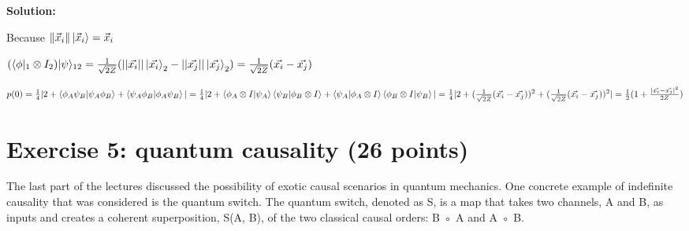 \documentclass[12pt]{article}
\begin{document}
\begin{enumerate}[start=4]
        \textbf{Solution:}

        Because $\|\vec{x}_i\|\ket{\vec{x}_i} = \vec{x}_i$


        $(\langle\phi|_1 \otimes I_2)|\psi\rangle_{12}
        \\=\frac{1}{\sqrt{2Z}}(||\vec{x_i}||\ket{\vec{x_i}}_2-||\vec{x_j}||\ket{\vec{x_j}}_2)
        \\=\frac{1}{\sqrt{2Z}}(\vec{x_i}-\vec{x_j})
        $

        $p(0)
        \\=\frac{1}{4}|2+\braket{\phi_A\psi_B|\psi_A\phi_B}+\braket{\psi_A\phi_B|\phi_A\psi_B}|
        \\=\frac{1}{4}|2+\braket{\phi_A\otimes I|\psi_A}\braket{\psi_B|\phi_B\otimes I}+\braket{\psi_A|\phi_A\otimes I}\braket{\phi_B\otimes I|\psi_B}|
        \\=\frac{1}{4}|2+(\frac{1}{\sqrt{2Z}}(\vec{x_i}-\vec{x_j}))^2+(\frac{1}{\sqrt{2Z}}(\vec{x_i}-\vec{x_j}))^2|
        \\=\frac{1}{2}(1+\frac{|\vec{x_i}-\vec{x_j}|^2}{2Z})
        $

    \end{enumerate}

\section{Exercise 5: quantum causality (26 points)}
The last part of the lectures discussed the possibility of exotic causal scenarios in quantum mechanics. One concrete example of indefinite causality that was considered is the quantum switch. The quantum switch, denoted as S, is a map that takes two channels, A and B, as inputs and creates a coherent superposition, S(A, B), of the two classical causal orders: B ◦ A and A ◦ B.
\end{document}
